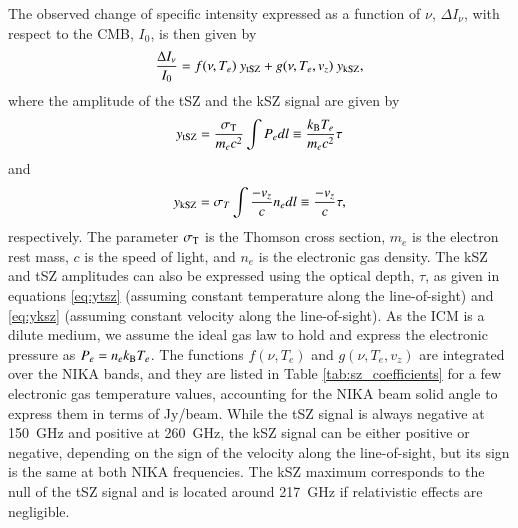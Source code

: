\documentclass[twocolumn,traditabstract]{aa}
\begin{document}
The observed change of specific intensity expressed as a function of $\nu$, $\Delta I_{\nu}$, with respect to the CMB, $I_0$, is then given by 
\begin{equation}
	\frac{\Delta I_{\nu}}{I_0} = f(\nu, T_e) \ y_{\rm tSZ} + g(\nu, T_e, v_z) \ y_{\rm kSZ},
\label{eq:dIsz}
\end{equation}
where the amplitude of the tSZ and the kSZ signal are given by
\begin{equation}
	y_{\rm tSZ} = \frac{\sigma_{\rm T}}{m_e c^2} \int P_e dl \equiv \frac{k_{\rm B} T_e}{m_e c^2} \tau
\label{eq:ytsz}
\end{equation}
and
\begin{equation}
	y_{\rm kSZ} = \sigma_T \int \frac{-v_z}{c} n_e dl \equiv \frac{-v_z}{c} \tau,
\label{eq:yksz}
\end{equation}
respectively. The parameter $\sigma_{\rm T}$ is the Thomson cross section, $m_e$ is the electron rest mass, $c$ is the speed of light, and $n_e$ is the electronic gas density. The kSZ and tSZ amplitudes can also be expressed using the optical depth, $\tau$, as given in equations \ref{eq:ytsz} (assuming constant temperature along the line-of-sight) and \ref{eq:yksz} (assuming constant velocity along the line-of-sight). As the ICM is a dilute medium, we assume the ideal gas law to hold and express the electronic pressure as $P_e = n_e k_{\rm B} T_e$. The functions $f(\nu, T_e)$ and $g(\nu, T_e, v_z)$ are integrated over the NIKA bands, and they are listed in Table \ref{tab:sz_coefficients} for a few electronic gas temperature values, accounting for the NIKA beam solid angle to express them in terms of Jy/beam. While the tSZ signal is always negative at 150~GHz and positive at 260~GHz, the kSZ signal can be either positive or negative, depending on the sign of the velocity along the line-of-sight, but its sign is the same at both NIKA frequencies. The kSZ maximum corresponds to the null of the tSZ signal and is located around 217~GHz if relativistic effects are negligible.

\end{document}
